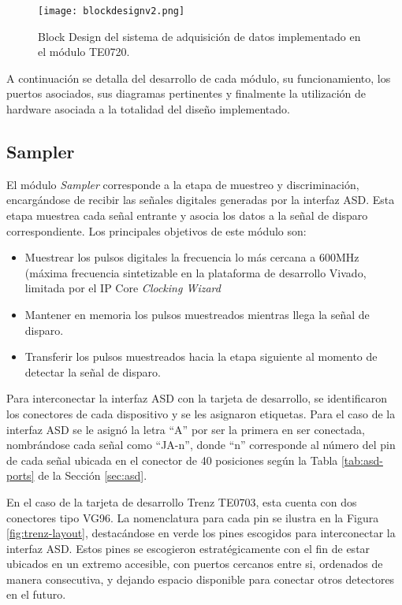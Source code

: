 	\begin{figure}[H]
		\centering
		\texttt{[image: blockdesignv2.png]}
		\caption{Block Design del sistema de adquisición de datos implementado en el módulo TE0720.}
		\label{fig:blockdesign}
	\end{figure}
	
	A continuación se detalla del desarrollo de cada módulo, su funcionamiento, los puertos asociados, sus diagramas pertinentes y finalmente la utilización de hardware asociada a la totalidad del diseño implementado. %
	
	\subsection{Sampler}
	\label{sec:sampling}
	
	El módulo \textit{Sampler} corresponde a la etapa de muestreo y discriminación, encargándose de recibir las señales digitales generadas por la interfaz ASD. Esta etapa muestrea cada señal entrante y asocia los datos a la señal de disparo correspondiente. Los principales objetivos de este módulo son:
	
	\begin{itemize}
		\item Muestrear los pulsos digitales la frecuencia lo más cercana a 600MHz (máxima frecuencia sintetizable en la plataforma de desarrollo Vivado, limitada por el IP Core \textit{Clocking Wizard}\cite{Xilinx2021ClockingSuite} %
		\item Mantener en memoria los pulsos muestreados mientras llega la señal de disparo.
		\item Transferir los pulsos muestreados hacia la etapa siguiente al momento de detectar la señal de disparo.
	\end{itemize}

	Para interconectar la interfaz ASD con la tarjeta de desarrollo, se identificaron los conectores de cada dispositivo y se les asignaron etiquetas. Para el caso de la interfaz ASD se le asignó la letra ``A'' por ser la primera en ser conectada, nombrándose cada señal como ``JA-n'', donde ``n'' corresponde al número del pin de cada señal ubicada en el conector de 40 posiciones según la Tabla \ref{tab:asd-ports} de la Sección \ref{sec:asd}.
	
	En el caso de la tarjeta de desarrollo Trenz TE0703, esta cuenta con dos conectores tipo VG96. La nomenclatura para cada pin se ilustra en la Figura \ref{fig:trenz-layout}, destacándose en verde los pines escogidos para interconectar la interfaz ASD. Estos pines se escogieron estratégicamente con el fin de estar ubicados en un extremo accesible, con puertos cercanos entre si, ordenados de manera consecutiva, y dejando espacio disponible para conectar otros detectores en el futuro.
	
